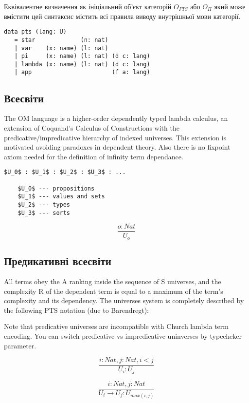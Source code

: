 \begin{definition}
\begin{definition}
\begin{definition}
\begin{definition}
Еквівалентне визначення як ініціальний об'єкт категорій $O_{PTS}$ або $O_\Pi$
який може вмістити цей синтаксис містить всі правила виводу
внутрішньої мови категорії.

\begin{lstlisting}[mathescape=true]
data pts (lang: U)
   = star             (n: nat)
   | var    (x: name) (l: nat)
   | pi     (x: name) (l: nat) (d c: lang)
   | lambda (x: name) (l: nat) (d c: lang)
   | app                       (f a: lang)
\end{lstlisting}


\subsection{Всесвіти}

The OM language is a higher-order dependently typed lambda calculus,
an extension of Coquand's Calculus of Constructions
with the predicative/impredicative hierarchy of indexed universes.
This extension is motivated avoiding paradoxes in dependent theory.
Also there is no fixpoint axiom needed for the definition
of infinity term dependance.

\begin{lstlisting}[mathescape=true]
    $U_0$ : $U_1$ : $U_2$ : $U_3$ : ...

    $U_0$ --- propositions
    $U_1$ --- values and sets
    $U_2$ --- types
    $U_3$ --- sorts
\end{lstlisting}

\begin{equation}
\tag{S}
\dfrac
{o : Nat}
{U_o}
\end{equation}

\newpage
\subsection*{Предикативні всесвіти}

All terms obey the A ranking inside the sequence of S universes,
and the complexity R of the dependent term is equal to a maximum of
the term's complexity and its dependency.
The universes system is completely described by the following
PTS notation (due to Barendregt):

Note that predicative universes are incompatible with Church lambda term encoding.
You can switch predicative vs impredicative uninverses by typecheker parameter.

\[
\tag{$A_1$}
\dfrac{i: Nat, j: Nat, i < j}{U_i : U_j}
\]

\[
\tag{$R_1$}
\dfrac{i : Nat, j : Nat}{U_i \rightarrow U_j : U_{max(i,j)} }
\]


\end{definition}
\end{definition}
\end{definition}
\end{definition}
